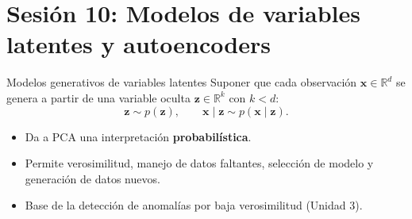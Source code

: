 \documentclass[aspectratio=169,11pt]{beamer}
\newcommand{\R}{\mathbb{R}}
\newcommand{\x}{\bm{x}}
\newcommand{\z}{\bm{z}}
\newcommand{\W}{\mathbf{W}}
\begin{document}
\section{Sesión 10: Modelos de variables latentes y autoencoders}

\begin{frame}{Modelos generativos de variables latentes}
  Suponer que cada observación $\x\in\R^d$ se genera a partir de una variable oculta
  $\z\in\R^k$ con $k<d$:
  \[
    \z \sim p(\z), \qquad \x \mid \z \sim p(\x\mid\z).
  \]
  \begin{itemize}
    \item Da a PCA una interpretación \textbf{probabilística}.
    \item Permite verosimilitud, manejo de datos faltantes, selección de modelo y generación de datos nuevos.
    \item Base de la detección de anomalías por baja verosimilitud (Unidad 3).
  \end{itemize}
  \vspace{4pt}
  \centering
\end{frame}
\end{document}
